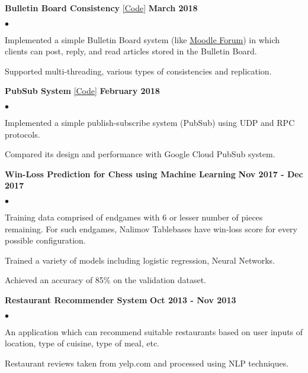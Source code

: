 \documentclass[margin,line]{res}
\newenvironment{list2}{
  \begin{list}{$\bullet$}{%
      \setlength{\itemsep}{0in}
      \setlength{\parsep}{0in} \setlength{\parskip}{0in}
      \setlength{\topsep}{0in} \setlength{\partopsep}{0in} 
      \setlength{\leftmargin}{0.2in}}}{\end{list}}
\begin{document}
\begin{resume}
{\bf Bulletin Board Consistency} \href{https://github.com/kudhru/Bulletin-Board}{\color{blue}[Code]} \hfill {\bf March 2018}\\

\vspace{-.3cm}
\begin{list2}
	\item Implemented a simple Bulletin Board system (like \href{https://moodle.org}{\color{blue}Moodle Forum}) in which clients can post, reply, and read articles stored in the Bulletin Board.
	\item Supported multi-threading, various types of consistencies and replication.
\end{list2}

{\bf PubSub System} \href{https://github.com/kudhru/publish-subscribe-system}{\color{blue}[Code]} \hfill {\bf February 2018}\\

\vspace{-.3cm}
\begin{list2}
	\item Implemented a simple publish-subscribe system (PubSub) using UDP and RPC protocols.
	\item Compared its design and performance with Google Cloud PubSub system.
\end{list2}

{\bf Win-Loss Prediction for Chess using Machine Learning} \hfill {\bf Nov 2017 - Dec 2017}\\

\vspace{-.3cm}
\begin{list2}
\item Training data comprised of endgames with 6 or lesser number of pieces remaining.
For such endgames, Nalimov Tablebases have win-loss score for every possible configuration.
\item Trained a variety of models including logistic regression, Neural Networks.
\item Achieved an accuracy of 85\% on the validation dataset.
\end{list2}

{\bf Restaurant Recommender System} \hfill {\bf Oct 2013 - Nov 2013}\\

\vspace{-.3cm}
\begin{list2}
\item An application which can recommend suitable restaurants based on user inputs of location, type of
cuisine, type of meal, etc.
\item Restaurant reviews taken from yelp.com and processed using NLP techniques.
\end{list2}


\end{resume}
\end{document}
